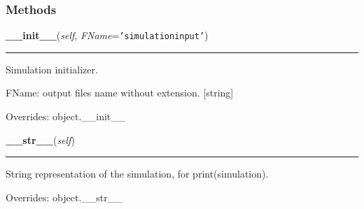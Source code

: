 
  \subsubsection{Methods}

    \vspace{0.5ex}

\hspace{.8\funcindent}\begin{boxedminipage}{\funcwidth}

    \raggedright \textbf{\_\_init\_\_}(\textit{self}, \textit{FName}={\tt 'simulationinput'})

    \vspace{-1.5ex}

    \rule{\textwidth}{0.5\fboxrule}
\setlength{\parskip}{2ex}
    Simulation initializer.

    FName: output files name without extension. [string]

\setlength{\parskip}{1ex}
      Overrides: object.\_\_init\_\_

    \end{boxedminipage}

    \vspace{0.5ex}

\hspace{.8\funcindent}\begin{boxedminipage}{\funcwidth}

    \raggedright \textbf{\_\_str\_\_}(\textit{self})

    \vspace{-1.5ex}

    \rule{\textwidth}{0.5\fboxrule}
\setlength{\parskip}{2ex}
    String representation of the simulation, for print(simulation).

\setlength{\parskip}{1ex}
      Overrides: object.\_\_str\_\_

    \end{boxedminipage}

    \label{theia:running:simulation:Simulation:numberOfOptics}


